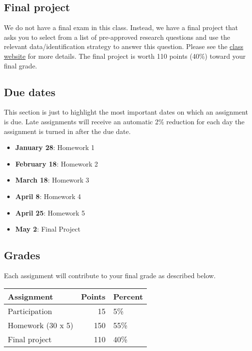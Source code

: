 \documentclass[11pt,]{article}
\providecommand{\tightlist}{%
  \setlength{\itemsep}{0pt}\setlength{\parskip}{0pt}}
\begin{document}
\hypertarget{final-project}{%
\subsection{Final project}\label{final-project}}

We do not have a final exam in this class. Instead, we have a final
project that asks you to select from a list of pre-approved research
questions and use the relevant data/identification strategy to answer
this question. Please see the
\href{https://econ470s22.classes.ianmccarthyecon.com/}{class website}
for more details. The final project is worth 110 points (40\%) toward
your final grade.

\hypertarget{due-dates}{%
\subsection{Due dates}\label{due-dates}}

This section is just to highlight the most important dates on which an
assignment is due. Late assignments will receive an automatic 2\%
reduction for each day the assignment is turned in after the due date.

\begin{itemize}
\tightlist
\item
  \textbf{January 28}: Homework 1
\item
  \textbf{February 18}: Homework 2
\item
  \textbf{March 18}: Homework 3
\item
  \textbf{April 8}: Homework 4
\item
  \textbf{April 25}: Homework 5
\item
  \textbf{May 2}: Final Project
\end{itemize}

\hypertarget{grades}{%
\subsection{Grades}\label{grades}}

Each assignment will contribute to your final grade as described below.

\begin{longtable}[]{@{}lrl@{}}
\toprule
Assignment & Points & Percent \\
\midrule
\endhead
Participation & 15 & 5\% \\
Homework (30 x 5) & 150 & 55\% \\
Final project & 110 & 40\% \\
\bottomrule
\end{longtable}
\end{document}
